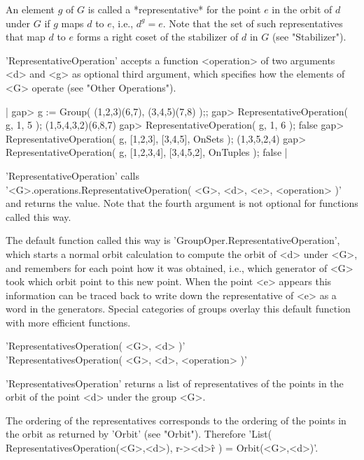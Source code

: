 An element $g$ of $G$ is called a *representative*  for  the point $e$ in
the orbit of $d$ under $G$ if $g$ maps $d$ to $e$, i.e., $d^g = e$.  Note
that the set  of such  representatives that map  $d$ to $e$ forms a right
coset of the stabilizer of $d$ in $G$ (see "Stabilizer").

'RepresentativeOperation' accepts a function <operation> of two arguments
<d> and <g> as optional third  argument, which specifies how the elements
of <G> operate (see "Other Operations").

|    gap> g := Group( (1,2,3)(6,7), (3,4,5)(7,8) );;
    gap> RepresentativeOperation( g, 1, 5 );
    (1,5,4,3,2)(6,8,7)
    gap> RepresentativeOperation( g, 1, 6 );
    false
    gap> RepresentativeOperation( g, [1,2,3], [3,4,5], OnSets );
    (1,3,5,2,4)
    gap> RepresentativeOperation( g, [1,2,3,4], [3,4,5,2], OnTuples );
    false |

'RepresentativeOperation' calls \\
'<G>.operations.RepresentativeOperation( <G>, <d>, <e>, <operation> )' \\
and returns the value.  Note that the fourth argument is not optional for
functions called this way.

The      default     function      called     this          way        is
'GroupOper.RepresentativeOperation',   which    starts   a  normal  orbit
calculation to compute the orbit of <d> under <G>, and remembers for each
point how it was obtained, i.e., which generator of  <G> took which orbit
point to this new point.  When the point <e> appears this information can
be traced back to write down the representative of <e>  as a  word in the
generators.  Special  categories of groups  overlay this default function
with more efficient functions.


'RepresentativesOperation( <G>, <d> )' \\
'RepresentativesOperation( <G>, <d>, <operation> )'

'RepresentativesOperation' returns  a  list  of  representatives of   the
points in the orbit of the point <d> under the group <G>.

The ordering  of the representatives corresponds  to  the ordering of the
points in  the orbit  as  returned by 'Orbit'  (see  "Orbit").  Therefore
'List( RepresentativesOperation(<G>,<d>), r-><d>\^r ) = Orbit(<G>,<d>)'.

